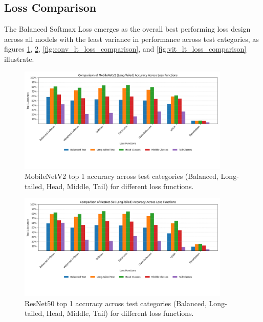 \subsection{Loss Comparison}
The Balanced Softmax Loss emerges as the overall best performing loss design across all models with the least variance in performance across test categories, as figures \ref{fig:mobilenet_lt_loss_comparison}, \ref{fig:resnet_lt_loss_comparison}, \ref{fig:conv_lt_loss_comparison}, and \ref{fig:vit_lt_loss_comparison} illustrate. 



\begin{figure}[h!]
    \centering
    \includegraphics[width=0.9\textwidth]{Images/Plots/mobilenet_lt_loss_comparison.png}
    \caption{MobileNetV2 top 1 accuracy across test categories (Balanced, Long-tailed, Head, Middle, Tail) for different loss functions.}
    \label{fig:mobilenet_lt_loss_comparison}
\end{figure}

\begin{figure}[h!]
    \centering
    \includegraphics[width=0.9\textwidth]{Images/Plots/resnet_lt_loss_comparison.png}
    \caption{ResNet50 top 1 accuracy across test categories (Balanced, Long-tailed, Head, Middle, Tail) for different loss functions.}
    \label{fig:resnet_lt_loss_comparison}
\end{figure}

